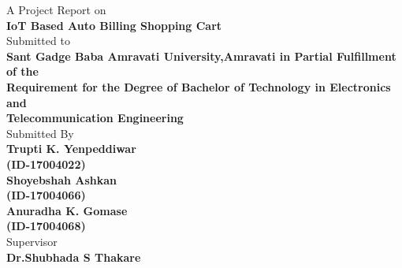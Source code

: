 \documentclass[12pt]{article}
\begin{document}
\thispagestyle{empty}
\begin{center}
A Project Report on\\
\vspace{4mm}
\textbf{\huge{IoT Based Auto Billing Shopping Cart}}\\
\vspace{6mm}
Submitted to\\{\textbf{Sant Gadge Baba Amravati University,Amravati in Partial Fulfillment of the
\\Requirement for the Degree of Bachelor of Technology in Electronics and\\Telecommunication Engineering\\}}
\vspace{4mm}
Submitted By \\
\textbf{\large{Trupti  K. Yenpeddiwar}}\\
\textbf{\large{(ID-17004022)}}\\
\textbf{\large{Shoyebshah Ashkan}}\\
\textbf{\large{(ID-17004066)}}\\
\textbf{\large{Anuradha K. Gomase}}\\
\textbf{\large{(ID-17004068)}}\\
\vspace{3mm}
Supervisor\\
\textbf{\large{Dr.Shubhada S Thakare}}
\vspace{3mm}
\end{center}
\end{document}
